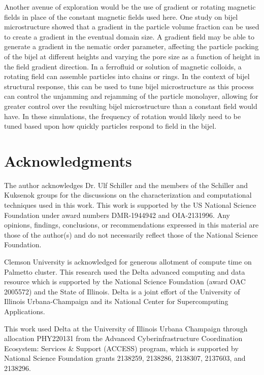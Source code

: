 Another avenue of exploration would be the use of gradient or rotating magnetic fields in place of the constant magnetic 
fields used here. One study on bijel microstructure showed that a gradient in the particle volume fraction can be used to 
create a gradient in the eventual domain size. A gradient field may be able to generate a gradient in the nematic order 
parameter, affecting the particle packing of the bijel at different heights and varying the pore size as a function of 
height in the field gradient direction. In a ferrofluid or solution of magnetic colloids, a rotating field can assemble 
particles into chains or rings. In the context of bijel structural response, this can be used to tune bijel microstructure 
as this process can control the unjamming and rejamming of the particle monolayer, allowing for greater control over the 
resulting bijel microstructure than a constant field would have. In these simulations, the frequency of rotation would 
likely need to be tuned based upon how quickly particles respond to field in the bijel.



\section{Acknowledgments}

The author acknowledges Dr. Ulf Schiller and the members of the Schiller and Kuksenok groups for the discussions on 
the characterization and computational techniques used in this work. This work is supported by the US National Science 
Foundation under award numbers DMR-1944942 and OIA-2131996. Any opinions, findings, conclusions, or recommendations 
expressed in this material are those of the author(s) and do not necessarily reflect those of the National Science 
Foundation.  

Clemson University is acknowledged for generous allotment of compute time on Palmetto cluster. This research used the 
Delta advanced computing and data resource which is supported by the National Science Foundation (award OAC 2005572) 
and the State of Illinois. Delta is a joint effort of the University of Illinois Urbana-Champaign and its National 
Center for Supercomputing Applications. 

This work used Delta at the University of Illinois Urbana Champaign through allocation PHY220131 from the Advanced 
Cyberinfrastructure Coordination Ecosystem: Services $\&$ Support (ACCESS) program, which is supported by National 
Science Foundation grants 2138259, 2138286, 2138307, 2137603, and 2138296. 
